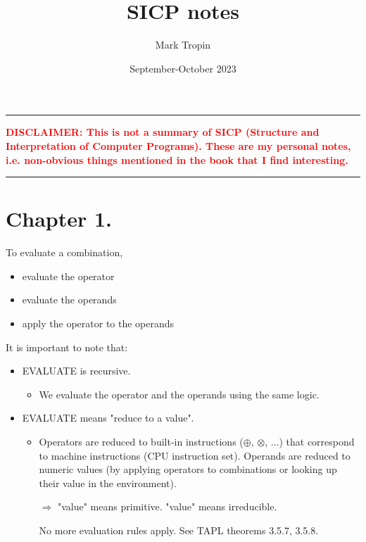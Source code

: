 \documentclass{article}
\title{SICP notes}
\author{Mark Tropin}
\date{September-October 2023}
\begin{document}
\large

\maketitle

\noindent
{\color{red} \rule{\linewidth}{0.5mm}}

\textcolor{red}{\textbf{DISCLAIMER: This is not a summary of SICP (Structure and Interpretation of Computer Programs). These are my personal notes, i.e. non-obvious things mentioned in the book that I find interesting.}}

\noindent
{\color{red} \rule{\linewidth}{0.5mm}}

\section*{Chapter 1.}

To evaluate a combination,
\begin{itemize}
    \item evaluate the operator
    \item evaluate the operands
    \item apply the operator to the operands
\end{itemize}

\noindent
It is important to note that:
\begin{itemize}
    \item EVALUATE is recursive.
    \begin{itemize}
        \item We evaluate the operator and the operands using the same logic.
    \end{itemize}
    \item EVALUATE means "reduce to a value".
    \begin{itemize}
        \item Operators are reduced to built-in instructions ($\oplus$, $\otimes$, $\dots$)
	that correspond to machine instructions (CPU instruction set).
	Operands are reduced to numeric values
	(by applying operators to combinations or
	looking up their value in the environment).
 
	$\Longrightarrow$ "value" means primitive. "value" means irreducible.
 
		No more evaluation rules apply. See TAPL theorems 3.5.7, 3.5.8.
 
    \end{itemize}
\end{itemize}
\end{document}
